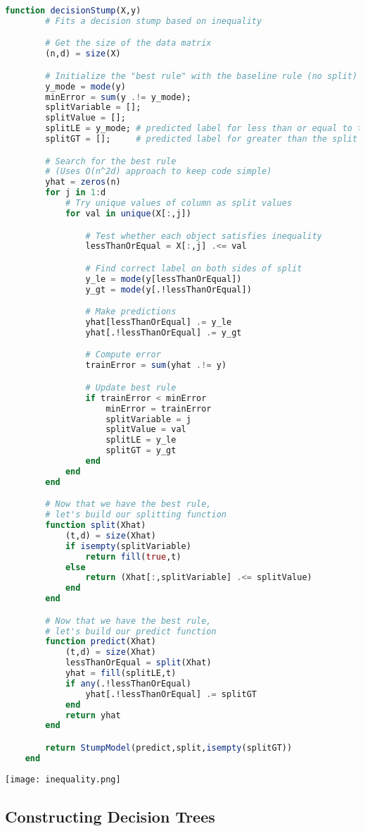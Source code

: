 \documentclass{article}
\begin{document}
\begin{lstlisting}[language=julia]
	function decisionStump(X,y)
		# Fits a decision stump based on inequality

		# Get the size of the data matrix
		(n,d) = size(X)

		# Initialize the "best rule" with the baseline rule (no split)
		y_mode = mode(y)
		minError = sum(y .!= y_mode);
		splitVariable = [];
		splitValue = [];
		splitLE = y_mode; # predicted label for less than or equal to the split value
		splitGT = [];     # predicted label for greater than the split value

		# Search for the best rule
		# (Uses O(n^2d) approach to keep code simple)
		yhat = zeros(n)
		for j in 1:d
			# Try unique values of column as split values
			for val in unique(X[:,j])

				# Test whether each object satisfies inequality
				lessThanOrEqual = X[:,j] .<= val

				# Find correct label on both sides of split
				y_le = mode(y[lessThanOrEqual])
				y_gt = mode(y[.!lessThanOrEqual])

				# Make predictions
				yhat[lessThanOrEqual] .= y_le
				yhat[.!lessThanOrEqual] .= y_gt

				# Compute error
				trainError = sum(yhat .!= y)

				# Update best rule
				if trainError < minError
					minError = trainError
					splitVariable = j
					splitValue = val
					splitLE = y_le
					splitGT = y_gt
				end
			end
		end

		# Now that we have the best rule,
		# let's build our splitting function
		function split(Xhat)
			(t,d) = size(Xhat)
			if isempty(splitVariable)
				return fill(true,t)
			else
				return (Xhat[:,splitVariable] .<= splitValue)
			end
		end

		# Now that we have the best rule,
		# let's build our predict function
		function predict(Xhat)
			(t,d) = size(Xhat)
			lessThanOrEqual = split(Xhat)
			yhat = fill(splitLE,t)
			if any(.!lessThanOrEqual)
				yhat[.!lessThanOrEqual] .= splitGT
			end
			return yhat
		end

		return StumpModel(predict,split,isempty(splitGT))
	end
\end{lstlisting}

\texttt{[image: inequality.png]}

\subsection{Constructing Decision Trees}
\end{document}
